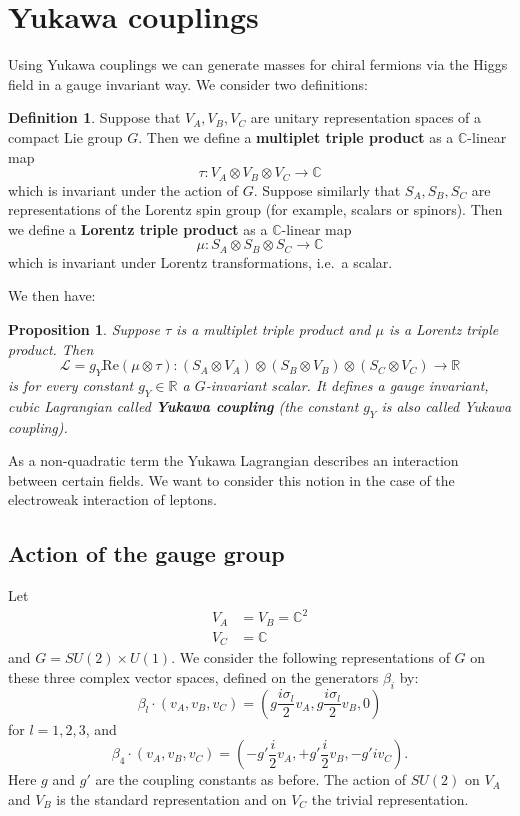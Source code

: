 \documentclass[11pt]{amsart}
\newtheorem{prop}[thm]{Proposition}
\theoremstyle{definition}
\newtheorem{defn}[thm]{Definition}
\theoremstyle{remark}
\numberwithin{equation}{section}
\begin{document}
\section{Yukawa couplings}\label{sect Yukawa}
Using Yukawa couplings we can generate masses for chiral fermions via the Higgs field in a gauge invariant way. We consider two definitions:
\begin{defn}
Suppose that $V_A,V_B,V_C$ are unitary representation spaces of a compact Lie group $G$. Then we define a {\bf multiplet triple product} as a $\mathbb{C}$-linear map
\begin{equation*}
\tau\colon V_A\otimes V_B\otimes V_C\longrightarrow\mathbb{C}
\end{equation*}
which is invariant under the action of $G$. Suppose similarly that $S_A,S_B,S_C$ are representations of the Lorentz spin group (for example, scalars or spinors). Then we define a {\bf Lorentz triple product} as a $\mathbb{C}$-linear map
\begin{equation*}
\mu\colon S_A\otimes S_B\otimes S_C\longrightarrow\mathbb{C}
\end{equation*}
which is invariant under Lorentz transformations, i.e.~a scalar.
\end{defn}
We then have:
\begin{prop}\label{prop yukawa coupling}Suppose $\tau$ is a multiplet triple product and $\mu$ is a Lorentz triple product. Then
\begin{equation*}
\mathcal{L}=g_Y\mathrm{Re}(\mu\otimes\tau)\colon (S_A\otimes V_A)\otimes (S_B\otimes V_B)\otimes (S_C\otimes V_C)\longrightarrow\mathbb{R}
\end{equation*}
is for every constant $g_Y\in\mathbb{R}$ a $G$-invariant scalar. It defines a gauge invariant, cubic Lagrangian called {\bf Yukawa coupling} (the constant $g_Y$ is also called Yukawa coupling). 
\end{prop}
As a non-quadratic term the Yukawa Lagrangian describes an interaction between certain fields. We want to consider this notion in the case of the electroweak interaction of leptons.
\subsection{Action of the gauge group}
Let 
\begin{align*}
V_A&=V_B=\mathbb{C}^2\\
V_C&=\mathbb{C}
\end{align*}
and $G=SU(2)\times U(1)$. We consider the following representations of $G$ on these three complex vector spaces, defined on the generators $\beta_i$ by:
\begin{equation*}
\beta_l\cdot (v_A,v_B,v_C)=\left(g\frac{i\sigma_l}{2}v_A,g\frac{i\sigma_l}{2}v_B,0\right)
\end{equation*}
for $l=1,2,3$, and
\begin{equation*}
\beta_4\cdot (v_A,v_B,v_C)=\left(-g'\frac{i}{2}v_A, +g'\frac{i}{2}v_B, -g'iv_C\right).
\end{equation*}
Here $g$ and $g'$ are the coupling constants as before. The action of $SU(2)$ on $V_A$ and $V_B$ is the standard representation and on $V_C$ the trivial representation. 
\end{document}
